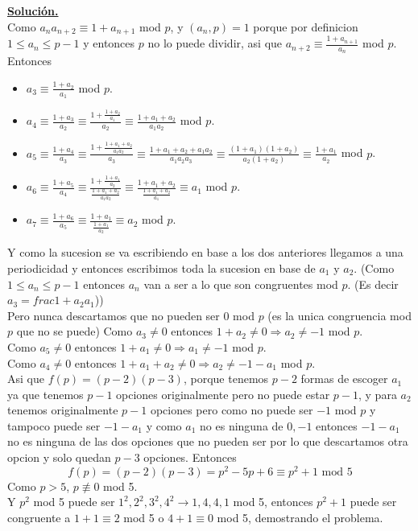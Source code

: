 \documentclass[11pt]{scrartcl}
\begin{document}
\underline{\textbf{Solución.}} \\
Como $a_na_{n+2}\equiv 1+a_{n+1}$ mod $p$, y $(a_n,p)=1$ porque por definicion $1\leq a_n \leq p-1$ y entonces $p$ no lo puede dividir, asi que $a_{n+2}\equiv \frac{1+a_{n+1}}{a_n}$ mod $p$. \\
Entonces 
\begin{itemize}
    \item $a_3 \equiv \frac{1+a_2}{a_1}$ mod $p$.
    \item $a_4 \equiv \frac{1+a_3}{a_2} \equiv \frac{1+\frac{1+a_2}{a_1}}{a_2} \equiv \frac{1+a_1+a_2}{a_1a_2}$ mod $p$.
    \item $a_5 \equiv \frac{1+a_4}{a_3} \equiv \frac{1+\frac{1+a_1+a_2}{a_1a_2}}{a_3}\equiv \frac{1+a_1+a_2+a_1a_2}{a_1a_2a_3} \equiv \frac{(1+a_1)(1+a_2)}{a_2(1+a_2)}\equiv \frac{1+a_1}{a_2}$ mod $p$.
    \item $a_6 \equiv \frac{1+a_5}{a_4} \equiv \frac{1+\frac{1+a_1}{a_2}}{\frac{1+a_1+a_2}{a_1a_2}} \equiv \frac{1+a_1+a_2}{\frac{1+a_1+a_2}{a_1}} \equiv a_1$ mod $p$.
    \item $a_7 \equiv \frac{1+a_6}{a_5} \equiv \frac{1+a_1}{\frac{1+a_1}{a_2}}\equiv a_2$ mod $p$.
\end{itemize}
Y como la sucesion se va escribiendo en base a los dos anteriores llegamos a una periodicidad y entonces escribimos toda la sucesion en base de $a_1$ y $a_2$. (Como $1\leq a_n \leq p-1$ entonces $a_n$ van a ser a lo que son congruentes mod $p$. (Es decir $a_3=frac{1+a_2}{a_1}$)) \\
Pero nunca descartamos que no pueden ser 0 mod $p$ (es la unica congruencia mod $p$ que no se puede)
Como $a_3 \neq 0$ entonces $1+a_2\neq 0 \Rightarrow a_2 \neq -1$ mod $p$. \\
Como $a_5 \neq 0$ entonces $1+a_1 \neq 0 \Rightarrow a_1 \neq -1$ mod $p$. \\
Como $a_4 \neq 0$ entonces $1+a_1+a_2 \neq 0 \Rightarrow a_2 \neq -1-a_1$ mod $p$. \\
Asi que $f(p)=(p-2)(p-3)$, porque tenemos $p-2$ formas de escoger $a_1$ ya que tenemos $p-1$ opciones originalmente pero no puede estar $p-1$, y para $a_2$ tenemos originalmente $p-1$ opciones pero como no puede ser $-1$ mod $p$ y tampoco puede ser $-1-a_1$ y como $a_1$ no es ninguna de $0,-1$ entonces $-1-a_1$ no es ninguna de las dos opciones que no pueden ser por lo que descartamos otra opcion y solo quedan $p-3$ opciones.
Entonces 
$$f(p)=(p-2)(p-3)=p^2-5p+6 \equiv p^2+1 \text{ mod } 5 $$
Como $p>5$, $p \not \equiv 0$ mod 5. \\
Y $p^2$ mod 5 puede ser $1^2,2^2,3^2,4^2 \rightarrow 1,4,4,1$ mod 5, entonces $p^2+1$ puede ser congruente a $1+1\equiv 2$ mod 5 o $4+1\equiv 0$ mod 5, demostrando el problema.
\end{document}
